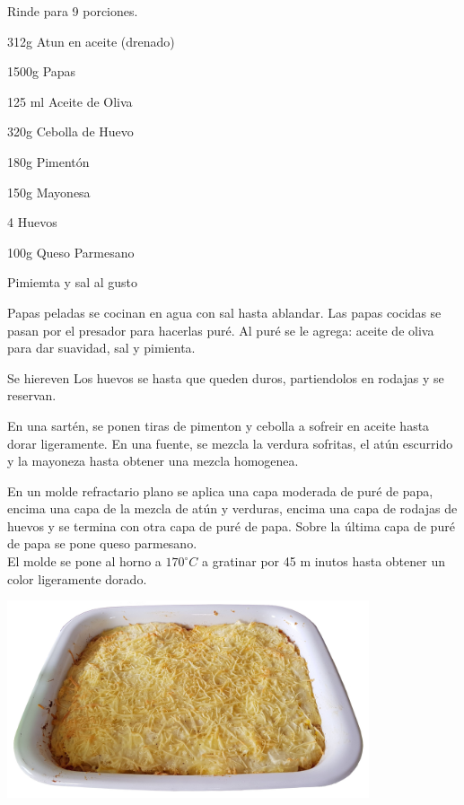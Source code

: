 
Rinde para 9 porciones.\\

\begin{ingredientes}
\item 312g Atun en aceite (drenado)
\item 1500g Papas
\item 125 ml Aceite de Oliva
\item 320g Cebolla de Huevo
\item 180g Pimentón
\item 150g Mayonesa
\item 4 Huevos
\item 100g Queso Parmesano
\item Pimiemta y sal al gusto
\end{ingredientes}
\preparacion

Papas peladas se cocinan en agua con sal hasta ablandar. Las papas cocidas se pasan por el presador para hacerlas puré. Al puré se le agrega: aceite de oliva para dar suavidad, sal y pimienta.

Se hiereven Los huevos se hasta que queden duros, partiendolos en rodajas y se reservan.

En una sartén, se ponen tiras de pimenton y cebolla a sofreir en aceite hasta dorar ligeramente. En una fuente, se mezcla la verdura sofritas, el atún escurrido y la mayoneza hasta obtener una mezcla homogenea. 

En un molde refractario plano se aplica una capa moderada de puré de papa, encima una capa de la mezcla de atún y verduras, encima una capa de rodajas de huevos y se termina con otra capa de puré de papa. Sobre la última capa de puré de papa se pone queso parmesano.\\

El molde se pone al horno a $170^{\circ}C$  a gratinar por 45 m inutos hasta obtener un color ligeramente dorado. \\

\vspace*{2cm}
\begin{center}
\includegraphics[width=0.8\textwidth]{fotos/molde_atun_2.jpeg}
\end{center}

